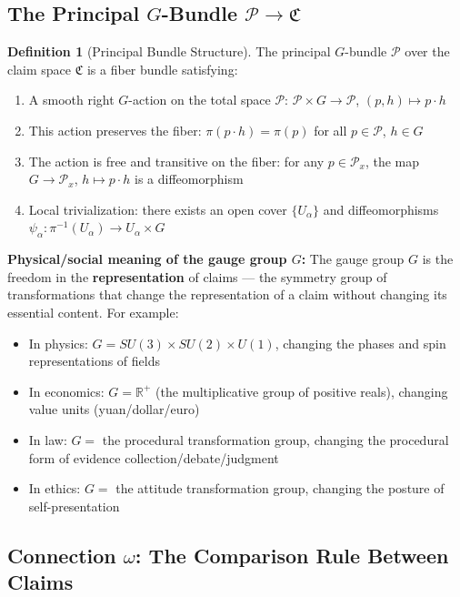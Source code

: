 \documentclass[12pt,a4paper]{article}
\theoremstyle{plain}
\theoremstyle{definition}
\newtheorem{definition}[theorem]{Definition}
\newcommand{\R}{\mathbb{R}}
\newcommand{\Pcal}{\mathcal{P}}
\newcommand{\conn}{\omega}
\newcommand{\ClaimSpace}{\mathfrak{C}}
\begin{document}
\subsection{The Principal $G$-Bundle $\Pcal \to \ClaimSpace$}

\begin{definition}[Principal Bundle Structure]
The principal $G$-bundle $\Pcal$ over the claim space $\ClaimSpace$ is a fiber bundle satisfying:
\begin{enumerate}[label=(\roman*)]
    \item A smooth right $G$-action on the total space $\Pcal$: $\Pcal \times G \to \Pcal$, $(p, h) \mapsto p \cdot h$
    \item This action preserves the fiber: $\pi(p \cdot h) = \pi(p)$ for all $p \in \Pcal$, $h \in G$
    \item The action is free and transitive on the fiber: for any $p \in \Pcal_x$, the map $G \to \Pcal_x$, $h \mapsto p \cdot h$ is a diffeomorphism
    \item Local trivialization: there exists an open cover $\{U_\alpha\}$ and diffeomorphisms $\psi_\alpha: \pi^{-1}(U_\alpha) \to U_\alpha \times G$
\end{enumerate}
\end{definition}

\textbf{Physical/social meaning of the gauge group $G$:}
The gauge group $G$ is the freedom in the \textbf{representation} of claims — the symmetry group of transformations that change the representation of a claim without changing its essential content. For example:
\begin{itemize}
    \item In physics: $G = SU(3) \times SU(2) \times U(1)$, changing the phases and spin representations of fields
    \item In economics: $G = \R^+$ (the multiplicative group of positive reals), changing value units (yuan/dollar/euro)
    \item In law: $G = $ the procedural transformation group, changing the procedural form of evidence collection/debate/judgment
    \item In ethics: $G = $ the attitude transformation group, changing the posture of self-presentation
\end{itemize}

\subsection{Connection $\conn$: The Comparison Rule Between Claims}
\end{document}
